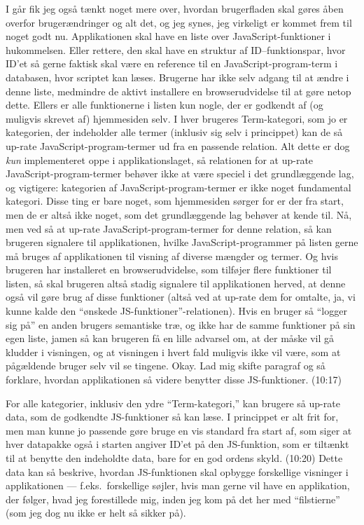 \documentclass{report}
\begin{document}
I går fik jeg også tænkt noget mere over, hvordan brugerfladen skal gøres åben overfor brugerændringer og alt det, og jeg synes, jeg virkeligt er kommet frem til noget godt nu. Applikationen skal have en liste over JavaScript-funktioner i hukommelsen. Eller rettere, den skal have en struktur af ID--funktionspar, hvor ID'et så gerne faktisk skal være en reference til en JavaScript-program-term i databasen, hvor scriptet kan læses. Brugerne har ikke selv adgang til at ændre i denne liste, medmindre de aktivt installere en browserudvidelse til at gøre netop dette. Ellers er alle funktionerne i listen kun nogle, der er godkendt af (og muligvis skrevet af) hjemmesiden selv. I hver brugeres Term-kategori, som jo er kategorien, der indeholder alle termer (inklusiv sig selv i princippet) kan de så up-rate JavaScript-program-termer ud fra en passende relation. Alt dette er dog \emph{kun} implementeret oppe i applikationslaget, så relationen for at up-rate JavaScript-program-termer behøver ikke at være speciel i det grundlæggende lag, og vigtigere: kategorien af JavaScript-program-termer er ikke noget fundamental kategori. Disse ting er bare noget, som hjemmesiden sørger for er der fra start, men de er altså ikke noget, som det grundlæggende lag behøver at kende til. Nå, men ved så at up-rate JavaScript-program-termer for denne relation, så kan brugeren signalere til applikationen, hvilke JavaScript-programmer på listen gerne må bruges af applikationen til visning af diverse mængder og termer. Og hvis brugeren har installeret en browserudvidelse, som tilføjer flere funktioner til listen, så skal brugeren altså stadig signalere til applikationen herved, at denne også vil gøre brug af disse funktioner (altså ved at up-rate dem for omtalte, ja, vi kunne kalde den ``ønskede JS-funktioner''-relationen). Hvis en bruger så ``logger sig på'' en anden brugers semantiske træ, og ikke har de samme funktioner på sin egen liste, jamen så kan brugeren få en lille advarsel om, at der måske vil gå kludder i visningen, og at visningen i hvert fald muligvis ikke vil være, som at pågældende bruger selv vil se tingene. Okay. Lad mig skifte paragraf og så forklare, hvordan applikationen så videre benytter disse JS-funktioner. (10:17)

For alle kategorier, inklusiv den ydre ``Term-kategori,'' kan brugere så up-rate data, som de godkendte JS-funktioner så kan læse. I princippet er alt frit for, men man kunne jo passende gøre bruge en vis standard fra start af, som siger at hver datapakke også i starten angiver ID'et på den JS-funktion, som er tiltænkt til at benytte den indeholdte data, bare for en god ordens skyld. (10:20) Dette data kan så beskrive, hvordan JS-funktionen skal opbygge forskellige visninger i applikationen --- f.eks.\ forskellige søjler, hvis man gerne vil have en applikation, der følger, hvad jeg forestillede mig, inden jeg kom på det her med ``filstierne'' (som jeg dog nu ikke er helt så sikker på). 
\end{document}
